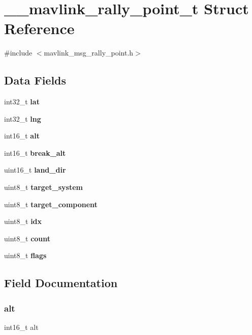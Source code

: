 \section{\+\_\+\+\_\+mavlink\+\_\+rally\+\_\+point\+\_\+t Struct Reference}
\label{struct____mavlink__rally__point__t}


{\ttfamily \#include $<$mavlink\+\_\+msg\+\_\+rally\+\_\+point.\+h$>$}

\subsection*{Data Fields}
\begin{DoxyCompactItemize}
\item 
int32\+\_\+t \textbf{ lat}
\item 
int32\+\_\+t \textbf{ lng}
\item 
int16\+\_\+t \textbf{ alt}
\item 
int16\+\_\+t \textbf{ break\+\_\+alt}
\item 
uint16\+\_\+t \textbf{ land\+\_\+dir}
\item 
uint8\+\_\+t \textbf{ target\+\_\+system}
\item 
uint8\+\_\+t \textbf{ target\+\_\+component}
\item 
uint8\+\_\+t \textbf{ idx}
\item 
uint8\+\_\+t \textbf{ count}
\item 
uint8\+\_\+t \textbf{ flags}
\end{DoxyCompactItemize}


\subsection{Field Documentation}
\mbox{\label{struct____mavlink__rally__point__t_ac9004ab53fc24e6cf561246a6b2d0786}} 
\subsubsection{alt}
{\footnotesize\ttfamily int16\+\_\+t alt}

\mbox{\label{struct____mavlink__rally__point__t_a7793d7165bf78a3d88ce98a9b2e196d5}} 
